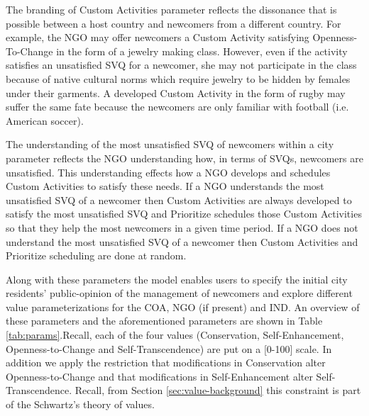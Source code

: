 \documentclass{scspaperproc}
\theoremstyle{scsthe}
\begin{document}
The branding of Custom Activities parameter reflects the dissonance that is possible between a host country and newcomers from a different country. For example, the NGO may offer newcomers a Custom Activity satisfying Openness-To-Change in the form of a jewelry making class. However, even if the activity satisfies an unsatisfied SVQ for a newcomer, she may not participate in the class because of native cultural norms which require jewelry to be hidden by females under their garments. A developed Custom Activity in the form of rugby may suffer the same fate because the newcomers are only familiar with football (i.e. American soccer). 

The understanding of the most unsatisfied SVQ of newcomers within a city parameter reflects the NGO understanding how, in terms of SVQs, newcomers are unsatisfied. This understanding effects how a NGO develops and schedules Custom Activities to satisfy these needs. If a NGO understands the most unsatisfied SVQ of a newcomer then Custom Activities are always developed to satisfy the most unsatisfied SVQ and Prioritize schedules those Custom Activities so that they help the most newcomers in a given time period. If a NGO does not understand the most unsatisfied SVQ of a newcomer then Custom Activities and Prioritize scheduling are done at random.

Along with these parameters the model enables users to specify the initial city residents' public-opinion of the management of newcomers and explore different value parameterizations for the COA, NGO (if present) and IND. An overview of these parameters and the aforementioned parameters are shown in Table \ref{tab:params}.Recall, each of the four values (Conservation, Self-Enhancement, Openness-to-Change and Self-Transcendence) are put on a [0-100] scale. In addition we apply the restriction that modifications in Conservation alter Openness-to-Change and that modifications in Self-Enhancement alter Self-Transcendence. Recall, from Section \ref{sec:value-background} this constraint is part of the Schwartz's theory of values.
\end{document}
